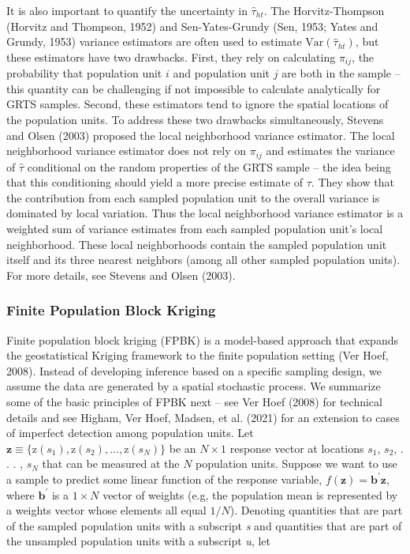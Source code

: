 \documentclass[]{elsarticle} %
\begin{document}
It is also important to quantify the uncertainty in \(\hat{\tau}_{ht}\).
The Horvitz-Thompson (Horvitz and Thompson, 1952) and Sen-Yates-Grundy
(Sen, 1953; Yates and Grundy, 1953) variance estimators are often used
to estimate \(\text{Var}(\hat{\tau}_{ht})\), but these estimators have
two drawbacks. First, they rely on calculating \(\pi_{ij}\), the
probability that population unit \(i\) and population unit \(j\) are
both in the sample -- this quantity can be challenging if not impossible
to calculate analytically for GRTS samples. Second, these estimators
tend to ignore the spatial locations of the population units. To address
these two drawbacks simultaneously, Stevens and Olsen (2003) proposed
the local neighborhood variance estimator. The local neighborhood
variance estimator does not rely on \(\pi_{ij}\) and estimates the
variance of \(\hat{\tau}\) conditional on the random properties of the
GRTS sample -- the idea being that this conditioning should yield a more
precise estimate of \(\tau\). They show that the contribution from each
sampled population unit to the overall variance is dominated by local
variation. Thus the local neighborhood variance estimator is a weighted
sum of variance estimates from each sampled population unit's local
neighborhood. These local neighborhoods contain the sampled population
unit itself and its three nearest neighbors (among all other sampled
population units). For more details, see Stevens and Olsen (2003).

\hypertarget{finite-population-block-kriging}{%
\subsubsection{Finite Population Block
Kriging}\label{finite-population-block-kriging}}

Finite population block kriging (FPBK) is a model-based approach that
expands the geostatistical Kriging framework to the finite population
setting (Ver Hoef, 2008). Instead of developing inference based on a
specific sampling design, we assume the data are generated by a spatial
stochastic process. We summarize some of the basic principles of FPBK
next -- see Ver Hoef (2008) for technical details and see Higham, Ver
Hoef, Madsen, et al. (2021) for an extension to cases of imperfect
detection among population units. Let
\({\mathbf{z} \equiv \{\text{z}(s_1), \text{z}(s_2), . . . , \text{z}(s_N) \}}\)
be an \(N \times 1\) response vector at locations \(s_1\), \(s_2\), . .
. , \(s_N\) that can be measured at the \(N\) population units. Suppose
we want to use a sample to predict some linear function of the response
variable, \(f(\mathbf{z}) = \mathbf{b}^\prime \mathbf{z}\), where
\(\mathbf{b}^\prime\) is a \(1 \times N\) vector of weights (e.g, the
population mean is represented by a weights vector whose elements all
equal \(1 / N\)). Denoting quantities that are part of the sampled
population units with a subscript \emph{s} and quantities that are part
of the unsampled population units with a subscript \emph{u}, let
\end{document}

